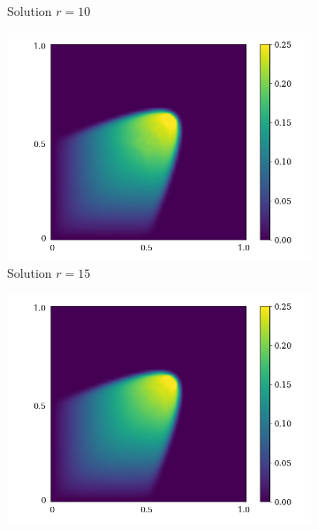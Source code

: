 \begin{figure}[!htb]
\begin{center}
\begin{subfigure}[b]{0.23\textwidth}
\begin{center}
            \end{center}
            \caption{Solution $r = 10$}
        \end{subfigure}
   \begin{subfigure}[b]{0.23\textwidth}
            \begin{center}
                \includegraphics[trim = {0, 0, 3cm, 0}, clip, width=\textwidth]{Pictures/X-rom-LE-DAE-15.png}
            \end{center}
            \caption{Solution $r = 15$}
        \end{subfigure}
   \begin{subfigure}[b]{0.23\textwidth}
            \begin{center}
                \includegraphics[trim = {0, 0, 3cm, 0}, clip, width=\textwidth]{Pictures/X-rom-LE-DAE-20.png}

\end{center}
\end{subfigure}
\end{center}
\end{figure}
